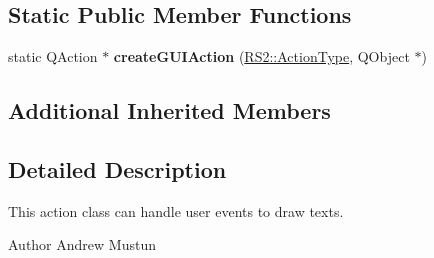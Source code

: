 \subsection*{Static Public Member Functions}
\begin{DoxyCompactItemize}
\item 
\hypertarget{classRS__ActionDrawText_a511d61433a65953522b3368a52f619bd}{static Q\-Action $\ast$ {\bfseries create\-G\-U\-I\-Action} (\hyperlink{classRS2_afe3523e0bc41fd637b892321cfc4b9d7}{R\-S2\-::\-Action\-Type}, Q\-Object $\ast$)}\label{classRS__ActionDrawText_a511d61433a65953522b3368a52f619bd}

\end{DoxyCompactItemize}
\subsection*{Additional Inherited Members}


\subsection{Detailed Description}
This action class can handle user events to draw texts.

\begin{DoxyAuthor}{Author}
Andrew Mustun 
\end{DoxyAuthor}


